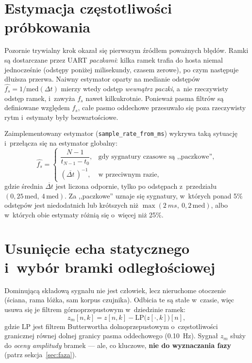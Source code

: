 \documentclass[12pt,a4paper,oneside]{report}
\begin{document}
\section{Estymacja częstotliwości próbkowania}
Pozornie trywialny krok okazał się pierwszym źródłem poważnych błędów.
Ramki są dostarczane przez UART \emph{paczkami}: kilka ramek trafia do hosta
niemal jednocześnie (odstępy poniżej milisekundy, czasem zerowe), po czym
następuje dłuższa przerwa. Naiwny estymator oparty na medianie odstępów
$\hat{f_s} = 1/\mathrm{med}(\Delta t)$ mierzy wtedy odstęp \emph{wewnątrz
paczki}, a~nie rzeczywisty odstęp ramek, i~zawyża $f_s$ nawet kilkukrotnie.
Ponieważ pasma filtrów są definiowane względem $f_s$, całe pasmo oddechowe
przesuwało się poza rzeczywisty rytm i~estymaty były bezwartościowe.

Zaimplementowany estymator (\texttt{sample\_rate\_from\_ms}) wykrywa taką
sytuację i~przełącza się na estymator globalny:
\begin{equation}
  \hat{f_s} =
  \begin{cases}
    \dfrac{N-1}{t_{N-1} - t_0}, & \text{gdy sygnatury czasowe są ,,paczkowe'',}\\[2ex]
    \left(\overline{\Delta t}\,\right)^{-1}, & \text{w~przeciwnym razie,}
  \end{cases}
  \label{eq:fs}
\end{equation}
gdzie średnia $\overline{\Delta t}$ jest liczona odpornie, tylko po odstępach
z~przedziału $(0{,}25\,\mathrm{med},\ 4\,\mathrm{med})$. Za ,,paczkowe'' uznaje
się sygnatury, w~których ponad 5\% odstępów jest niedodatnich lub krótszych
niż $\max(\SI{2}{ms},\ 0{,}2\,\mathrm{med})$, albo w~których obie estymaty
różnią się o~więcej niż 25\%.

\section{Usunięcie echa statycznego i~wybór bramki odległościowej}
\label{sec:bramkowanie}
Dominującą składową sygnału nie jest człowiek, lecz nieruchome otoczenie
(ściana, rama łóżka, sam korpus czujnika). Odbicia te są stałe w~czasie,
więc usuwa się je filtrem górnoprzepustowym w~dziedzinie ramek:
\begin{equation}
  z_m[n,k] = z[n,k] - \mathrm{LP}\big(z[\cdot,k]\big)[n],
  \label{eq:clutter}
\end{equation}
gdzie $\mathrm{LP}$ jest filtrem Butterwortha dolnoprzepustowym o~częstotliwości
granicznej równej dolnej granicy pasma oddechowego (\SI{0.10}{Hz}). Sygnał
$z_m$ służy do \emph{oceny amplitudy} bramek --- ale, co kluczowe,
\textbf{nie do wyznaczania fazy} (patrz sekcja~\ref{sec:faza}).
\end{document}
